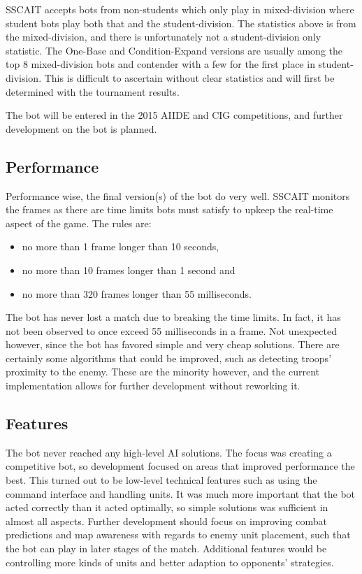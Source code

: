 SSCAIT accepts bots from non-students which only play in mixed-division where student bots play both that and the student-division. The statistics above is from the mixed-division, and there is unfortunately not a student-division only statistic. The One-Base and Condition-Expand versions are usually among the top 8 mixed-division bots and contender with a few for the first place in student-division. This is difficult to ascertain without clear statistics and will first be determined with the tournament results.

The bot will be entered in the 2015 AIIDE and CIG competitions, and further development on the bot is planned.

	\subsection*{Performance}
	Performance wise, the final version(s) of the bot do very well. SSCAIT monitors the frames as there are time limits bots must satisfy to upkeep the real-time aspect of the game. The rules are:
	\begin{itemize}
		\item no more than 1 frame longer than 10 seconds,
		\item no more than 10 frames longer than 1 second and
		\item no more than 320 frames longer than 55 milliseconds.
	\end{itemize}
	The bot has never lost a match due to breaking the time limits. In fact, it has not been observed to once exceed 55 milliseconds in a frame. Not unexpected however, since the bot has favored simple and very cheap solutions. There are certainly some algorithms that could be improved, such as detecting troops' proximity to the enemy. These are the minority however, and the current implementation allows for further development without reworking it.

	\subsection*{Features}
	The bot never reached any high-level AI solutions. The focus was creating a competitive bot, so development focused on areas that improved performance the best. This turned out to be low-level technical features such as using the command interface and handling units. It was much more important that the bot acted correctly than it acted optimally, so simple solutions was sufficient in almost all aspects. Further development should focus on improving combat predictions and map awareness with regards to enemy unit placement, such that the bot can play in later stages of the match. Additional features would be controlling more kinds of units and better adaption to opponents' strategies.
	
